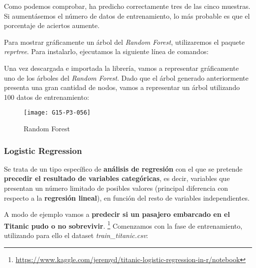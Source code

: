 \documentclass [a4paper] {article}
\begin{document}
Como podemos comprobar, ha predicho correctamente tres de las cinco muestras. Si aumentásemos el número de datos de entrenamiento, lo más probable es que el porcentaje de aciertos aumente.

Para mostrar gráficamente un árbol del \textit{Random Forest}, utilizaremos el paquete \textit{reprtree}. Para instalarlo, ejecutamos la siguiente línea de comandos:
\begin{Schunk}
\end{Schunk}

Una vez descargada e importada la librería, vamos a representar gráficamente uno de los árboles del \textit{Random Forest}. Dado que el árbol generado anteriormente presenta una gran cantidad de nodos, vamos a representar un árbol utilizando 100 datos de entrenamiento:

\begin{figure}[h!]
\centering
\texttt{[image: G15-P3-056]}
\caption{Random Forest}
\end{figure}

\newpage
\subsubsection{Logistic Regression}
Se trata de un tipo específico de \textbf{análisis de regresión} con el que se pretende \textbf{precedir el resultado de variables categóricas}, es decir, variables que presentan un número limitado de posibles valores (principal diferencia con respecto a la \textbf{regresión lineal}), en función del resto de variables independientes.

A modo de ejemplo vamos a \textbf{predecir si un pasajero embarcado en el Titanic pudo o no sobrevivir}. \footnote{\url{https://www.kaggle.com/jeremyd/titanic-logistic-regression-in-r/notebook}} Comenzamos con la fase de entrenamiento, utilizando para ello el dataset \textit{train\_titanic.csv}:
\end{document}
